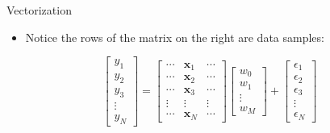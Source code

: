\begin{frame}{Vectorization}
\begin{itemize}
    \item Notice the rows of the matrix on the right are data samples:
\end{itemize}

\[
\begin{bmatrix}
    y_1 \\
    y_2 \\
    y_3 \\
    \vdots \\
    y_N
\end{bmatrix}
=
\begin{bmatrix}
    \cdots & \mathbf{x}_1 & \cdots \\
    \cdots & \mathbf{x}_2 & \cdots \\
    \cdots & \mathbf{x}_3 & \cdots \\
    \vdots & \vdots & \vdots \\
    \cdots & \mathbf{x}_N & \cdots
\end{bmatrix}
\begin{bmatrix}
    w_0 \\
    w_1 \\
    \vdots \\
    w_M
\end{bmatrix}
+
\begin{bmatrix}
    \epsilon_1 \\
    \epsilon_2 \\
    \epsilon_3 \\
    \vdots \\
    \epsilon_N
\end{bmatrix}
\]

\end{frame}


